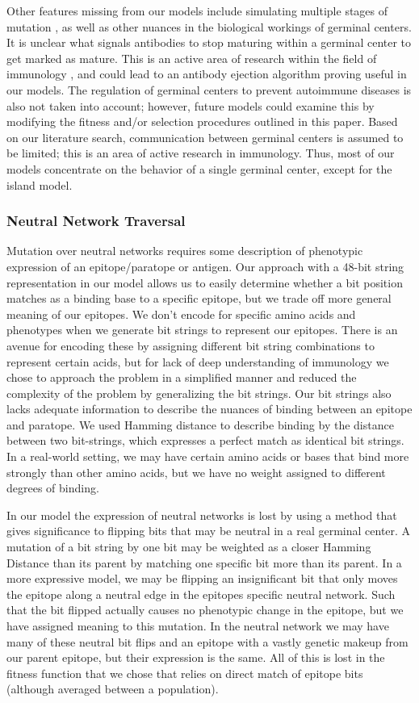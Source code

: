\documentclass[conference]{IEEEtran}
\begin{document}
Other features missing from our models include simulating multiple stages of mutation \cite{b1}, as well as other nuances in the biological workings of germinal centers. It is unclear what signals antibodies to stop maturing within a germinal center to get marked as mature. This is an active area of research within the field of immunology \cite{b4}, and could lead to an antibody ejection algorithm proving useful in our models. The regulation of germinal centers to prevent autoimmune diseases is also not taken into account; however, future models could examine this by modifying the fitness and/or selection procedures outlined in this paper. Based on our literature search, communication between germinal centers is assumed to be limited; this is an area of active research in immunology. Thus, most of our models concentrate on the behavior of a single germinal center, except for the island model.


\subsubsection{Neutral Network Traversal}
Mutation over neutral networks requires some description of phenotypic expression of an epitope/paratope or antigen. Our approach with a 48-bit string representation in our model allows us to easily determine whether a bit position matches as a binding base to a specific epitope, but we trade off more general meaning of our epitopes. We don’t encode for specific amino acids and phenotypes when we generate bit strings to represent our epitopes. There is an avenue for encoding these by assigning different bit string combinations to represent certain acids, but for lack of deep understanding of immunology we chose to approach the problem in a simplified manner and reduced the complexity of the problem by generalizing the bit strings. Our bit strings also lacks adequate information to describe the nuances of binding between an epitope and paratope. We used Hamming distance to describe binding by the distance between two bit-strings, which expresses a perfect match as identical bit strings. In a real-world setting, we may have certain amino acids or bases that bind more strongly than other amino acids, but we have no weight assigned to different degrees of binding. 


In our model the expression of neutral networks is lost by using a method that gives significance to flipping bits that may be neutral in a real germinal center. A mutation of a bit string by one bit may be weighted as a closer Hamming Distance than its parent by matching one specific bit more than its parent. In a more expressive model, we may be flipping an insignificant bit that only moves the epitope along a neutral edge in the epitopes specific neutral network. Such that the bit flipped actually causes no phenotypic change in the epitope, but we have assigned meaning to this mutation. In the neutral network we may have many of these neutral bit flips and an epitope with a vastly genetic makeup from our parent epitope, but their expression is the same. All of this is lost in the fitness function that we chose that relies on direct match of epitope bits (although averaged between a population). 
\end{document}
